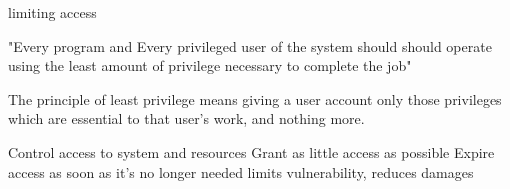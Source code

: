 limiting access 

"Every program and Every privileged user of the system should should operate using the least
amount of privilege necessary to complete the job" 

The principle of least privilege 
  means giving a user account only those privileges which are
  essential to that user's work, and nothing more.

  Control access to system and resources 
  Grant as little access as possible 
  Expire access as soon as it's no longer needed 
  limits vulnerability, reduces damages 

